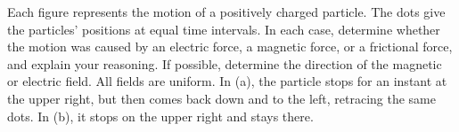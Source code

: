         Each figure represents the motion of a positively charged particle. The dots give the
        particles' positions at equal time intervals. In each case, determine
        whether the motion was caused by an electric force, a magnetic force,
        or a frictional force, and explain your reasoning. If possible, determine
        the direction of the magnetic or electric field. All fields are uniform.
        In (a), the particle stops for an instant at the upper right, but then
        comes back down and to the left, retracing the same dots.
        In (b), it stops on the upper right and stays there.
